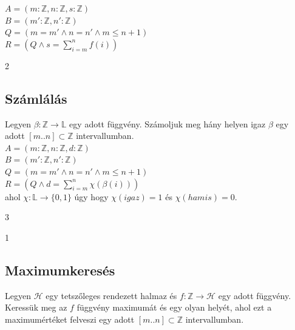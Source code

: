 \documentclass[a4paper,12pt]{article}
\newcommand{\lv}{{:}}
\begin{document}
$A = (m\lv\mathbb{Z}, n\lv\mathbb{Z}, s\lv\mathbb{Z})$\\[2pt]
$B = (m'\lv\mathbb{Z}, n'\lv\mathbb{Z})$\\[2pt]
$Q = (m = m' \land n = n' \land m \leqslant n+1)$\\[2pt]
$R = (Q \land s = \sum\limits_{i=m}^{n}f(i))$
\medskip
\begin{stuki}
  \begin{WHILE}{2}{}
  \end{WHILE}
\end{stuki}

\subsection{Számlálás}
Legyen $\beta\colon \mathbb{Z}\rightarrow\mathbb{L}$ egy adott függvény. Számoljuk meg hány helyen igaz $\beta$ egy adott $[m..n]\subset \mathbb{Z}$ intervallumban.\\

$A = (m\lv\mathbb{Z}, n\lv\mathbb{Z},d\lv\mathbb{Z})$\\[2pt]
$B = (m'\lv\mathbb{Z}, n'\lv\mathbb{Z})$\\[2pt]
$Q = (m = m' \land n = n' \land m \leqslant n+1)$\\[2pt]
$R = (Q \land d = \sum\limits_{i=m}^{n}\chi(\beta(i)))$\\[2pt]
ahol $\chi\colon \mathbb{L}\rightarrow \{0,1\}$ úgy hogy $\chi(igaz) = 1$ és $\chi(hamis) = 0$.
\medskip
\begin{stuki}
  \begin{WHILE}{3}{}
    \begin{IF}{1}{}
      \ELSE
    \end{IF}
  \end{WHILE}
\end{stuki}

\subsection{Maximumkeresés}
Legyen $\mathcal{H}$ egy tetszőleges rendezett halmaz és $f\colon \mathbb{Z}\rightarrow\mathcal{H}$ egy adott függvény. Keressük meg az $f$ függvény maximumát és egy olyan helyét, ahol ezt a maximumértéket felveszi egy adott $[m..n]\subset \mathbb{Z}$ intervallumban.\\
\end{document}
